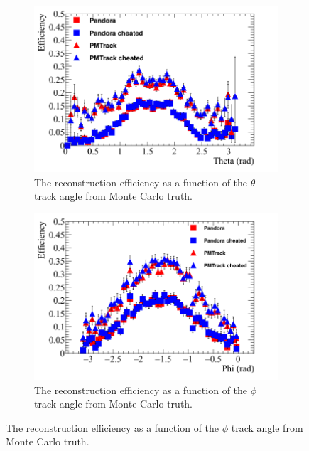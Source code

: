 \begin{figure}
  \begin{subfigure}{0.48\textwidth}
        \centering
        \includegraphics[width=\textwidth]{Effic_ProtonEnrich_500V_Proton_Theta}
        \caption{The reconstruction efficiency as a function of the $\theta$ track angle from Monte Carlo truth.}
        \label{fig:Prot_Effic_Theta}
  \end{subfigure}%
  \hspace{0.03\textwidth}%
  \begin{subfigure}{0.48\textwidth}
        \centering
        \includegraphics[width=\textwidth]{Effic_ProtonEnrich_500V_Proton_Phi}
        \caption{The reconstruction efficiency as a function of the $\phi$ track angle from Monte Carlo truth.}
        \label{fig:Prot_Effic_Phi}
  \end{subfigure}

\end{figure}
